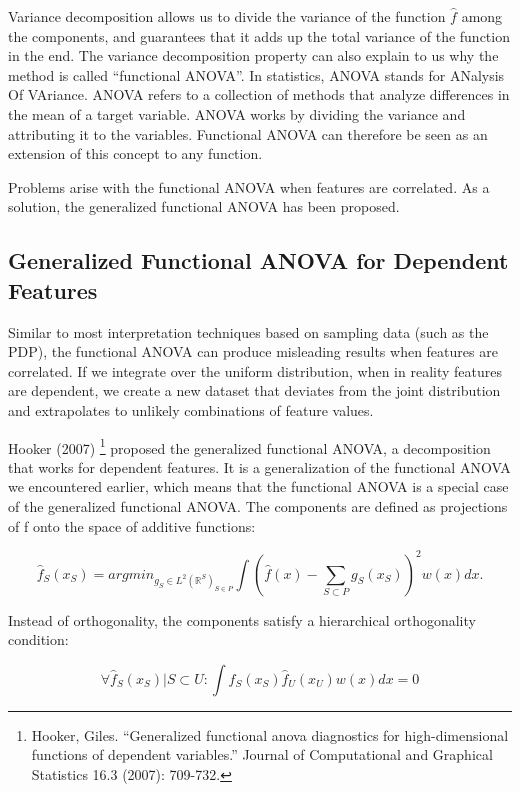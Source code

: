 \documentclass[
  10pt,
]{scrbook}
\begin{document}
Variance decomposition allows us to divide the variance of the function \(\hat{f}\) among the components, and guarantees that it adds up the total variance of the function in the end.
The variance decomposition property can also explain to us why the method is called ``functional ANOVA''.
In statistics, ANOVA stands for ANalysis Of VAriance.
ANOVA refers to a collection of methods that analyze differences in the mean of a target variable.
ANOVA works by dividing the variance and attributing it to the variables.
Functional ANOVA can therefore be seen as an extension of this concept to any function.

Problems arise with the functional ANOVA when features are correlated.
As a solution, the generalized functional ANOVA has been proposed.

\hypertarget{generalized-functional-anova-for-dependent-features}{%
\subsection{Generalized Functional ANOVA for Dependent Features}\label{generalized-functional-anova-for-dependent-features}}

Similar to most interpretation techniques based on sampling data (such as the PDP), the functional ANOVA can produce misleading results when features are correlated.
If we integrate over the uniform distribution, when in reality features are dependent, we create a new dataset that deviates from the joint distribution and extrapolates to unlikely combinations of feature values.

Hooker (2007) \footnote{Hooker, Giles. ``Generalized functional anova diagnostics for high-dimensional functions of dependent variables.'' Journal of Computational and Graphical Statistics 16.3 (2007): 709-732.} proposed the generalized functional ANOVA, a decomposition that works for dependent features.
It is a generalization of the functional ANOVA we encountered earlier, which means that the functional ANOVA is a special case of the generalized functional ANOVA.
The components are defined as projections of f onto the space of additive functions:

\[\hat{f}_S(x_S) = argmin_{g_S \in L^2(\mathbb{R}^S)_{S \in P}} \int \left(\hat{f}(x)  - \sum_{S \subset P} g_S(x_S)\right)^2 w(x)dx.\]

Instead of orthogonality, the components satisfy a hierarchical orthogonality condition:

\[\forall \hat{f}_S(x_S)| S \subset U: \int \hat{f}_S(x_S) \hat{f}_U(x_U) w(x)dx = 0\]
\end{document}
